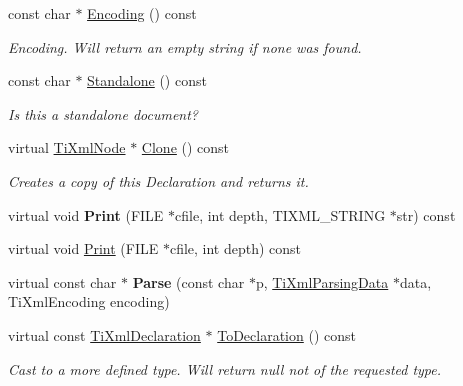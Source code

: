 \begin{DoxyCompactItemize}
const char $\ast$ \hyperlink{classTiXmlDeclaration_a8d3d1b5b226daa8353276d719497be80}{Encoding} () const
\begin{DoxyCompactList}\small\item\em Encoding. Will return an empty string if none was found. \end{DoxyCompactList}\item 
\mbox{\label{classTiXmlDeclaration_a1f2f8a741593d15a61e491e5024cacef}} 
const char $\ast$ \hyperlink{classTiXmlDeclaration_a1f2f8a741593d15a61e491e5024cacef}{Standalone} () const
\begin{DoxyCompactList}\small\item\em Is this a standalone document? \end{DoxyCompactList}\item 
\mbox{\label{classTiXmlDeclaration_a35dc1455f69b79e81cae28e186944610}} 
virtual \hyperlink{classTiXmlNode}{Ti\+Xml\+Node} $\ast$ \hyperlink{classTiXmlDeclaration_a35dc1455f69b79e81cae28e186944610}{Clone} () const
\begin{DoxyCompactList}\small\item\em Creates a copy of this Declaration and returns it. \end{DoxyCompactList}\item 
\mbox{\label{classTiXmlDeclaration_ace687d02a5a25a060ae3802abb1b3f55}} 
virtual void {\bfseries Print} (F\+I\+LE $\ast$cfile, int depth, T\+I\+X\+M\+L\+\_\+\+S\+T\+R\+I\+NG $\ast$str) const
\item 
virtual void \hyperlink{classTiXmlDeclaration_ae46cff6565f299210ab945e78bf28514}{Print} (F\+I\+LE $\ast$cfile, int depth) const
\item 
\mbox{\label{classTiXmlDeclaration_a9839ea97ed687a2b7342fd7b0f04361b}} 
virtual const char $\ast$ {\bfseries Parse} (const char $\ast$p, \hyperlink{classTiXmlParsingData}{Ti\+Xml\+Parsing\+Data} $\ast$data, Ti\+Xml\+Encoding encoding)
\item 
\mbox{\label{classTiXmlDeclaration_aab62703b620d9b9391b482dc1835ecf6}} 
virtual const \hyperlink{classTiXmlDeclaration}{Ti\+Xml\+Declaration} $\ast$ \hyperlink{classTiXmlDeclaration_aab62703b620d9b9391b482dc1835ecf6}{To\+Declaration} () const
\begin{DoxyCompactList}\small\item\em Cast to a more defined type. Will return null not of the requested type. \end{DoxyCompactList}\item 

\end{DoxyCompactItemize}
